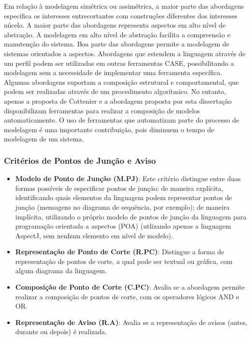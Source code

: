 Em relação à modelagem simétrica ou assimétrica, a maior parte das abordagens especifica os interesses entrecortantes com construções diferentes dos
interesses núcelo. A maior parte das abordagens representa aspectos em alto nível de abstração. A modelagem em alto nível de abstração facilita a
compreensão e manutenção do sistema. Boa parte das abordagens permite a modelagem de sistemas orientados a aspectos. Abordagens que estendem a
linguagem através de um perfil podem ser utilizadas em outras ferramentas CASE, possibilitando a modelagem sem a necessidade de implementar uma
ferramenta específica. Algumas abordagens suportam a composição estrutural e comportamental, que podem ser realizadas através de um procedimento
algorítmico. No entanto, apenas a proposta de Cottenier e a abordagem proposta por esta dissertação disponibilizam ferramentas para realizar 
a composição de modelos automaticamente. O uso de ferramentas que automatizam parte do processo de modelagem é uma importante contribuição, pois
diminuem o tempo de modelagem de um sistema.

\subsubsection{Critérios de Pontos de Junção e Aviso}

\begin{itemize}
	\item \textbf{Modelo de Ponto de Junção (M.PJ)}: Este critério distingue entre duas formas possíveis de especificar pontos de junção: de maneira
	explícita, identificando quais elementos da linguagem podem representar pontos de junção (mensagens no diagrama de sequência, por exemplo); de
	maneira implícita, utilizando o próprio modelo de pontos de junção da linguagem para programação orientada a aspectos (POA) (utlizando apenas a
	linguagem AspectJ, sem nenhum elemento em nível de modelo).
	\item \textbf{Representação de Ponto de Corte (R.PC)}: Distingue a forma de representação de pontos de corte, a qual pode ser textual ou gráfica,
	com algum diagrama da linguagem. 
	\item \textbf{Composição de Ponto de Corte (C.PC)}: Avalia se a abordagem permite realizar a composição de pontos de corte, com os operadores
	lógicos AND e OR. 
	\item \textbf{Representação de Aviso (R.A)}: Avalia se a representação de avisos (antes, durante ou depois) é realizada.
\end{itemize}

